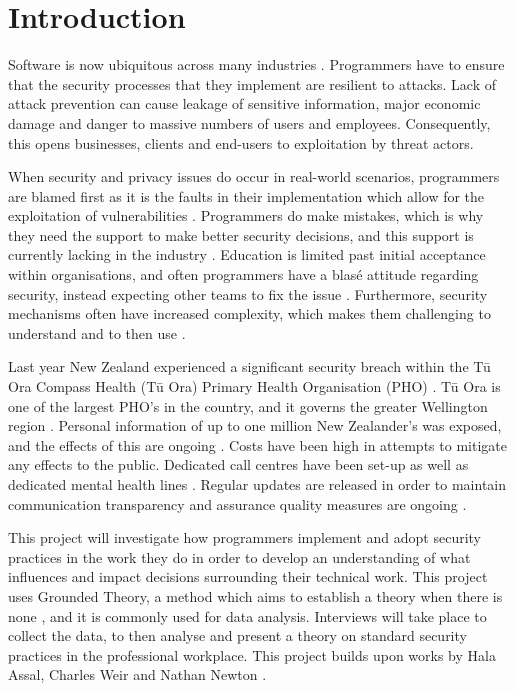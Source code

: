 \chapter{Introduction}\label{C:intro}

\par Software is now ubiquitous across many industries \cite{ubiq}. Programmers have to ensure that the security processes that they implement are resilient to attacks. Lack of attack prevention can cause leakage of sensitive information, major economic damage and danger to massive numbers of users and employees. Consequently, this opens businesses, clients and end-users to exploitation by threat actors. 
\newline
\par When security and privacy issues do occur in real-world scenarios, programmers are blamed first as it is the faults in their implementation which allow for the exploitation of vulnerabilities \cite{4}. Programmers do make mistakes, which is why they need the support to make better security decisions, and this support is currently lacking in the industry \cite{4}. Education is limited past initial acceptance within organisations, and often programmers have a blasé attitude regarding security, instead expecting other teams to fix the issue \cite{5}. Furthermore, security mechanisms often have increased complexity, which makes them challenging to understand and to then use \cite{6}. 
\newline
\par
Last year New Zealand experienced a significant security breach within the Tū Ora Compass Health (Tū Ora) Primary Health Organisation (PHO) \cite{incident}. Tū Ora is one of the largest PHO's in the country, and it governs the greater Wellington region \cite{incident}. Personal information of up to one million New Zealander's was exposed, and the effects of this are ongoing \cite{incident}. Costs have been high in attempts to mitigate any effects to the public. Dedicated call centres have been set-up as well as dedicated mental health lines \cite{healthpol, incident}. Regular updates are released in order to maintain communication transparency and assurance quality measures are ongoing \cite{healthpol, incident}. 
\newline
\par This project will investigate how programmers implement and adopt security practices in the work they do in order to develop an understanding of what influences and impact decisions surrounding their technical work. This project uses Grounded Theory, a method which aims to establish a theory when there is none \cite{2}, and it is commonly used for data analysis. Interviews will take place to collect the data, to then analyse and present a theory on standard security practices in the professional workplace. This project builds upon works by Hala Assal, Charles Weir and Nathan Newton \cite{summary1, 1, nathan}. 
